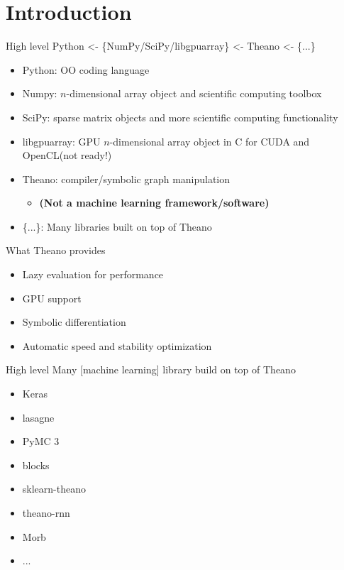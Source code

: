 \documentclass[utf8x,xcolor=pdftex,dvipsnames,table]{beamer}
\begin{document}
\section{Introduction}
\begin{frame}
  \tableofcontents[currentsection]
\end{frame}

\begin{frame}{High level}\setcounter{page}{1}
  Python <- \{NumPy/SciPy/libgpuarray\} <- Theano <- \{...\}
  \begin{itemize}
  \item Python: OO coding language
  \item Numpy: $n$-dimensional array object and scientific computing toolbox
  \item SciPy: sparse matrix objects and more scientific computing functionality
  \item libgpuarray: GPU $n$-dimensional array object in C for CUDA and OpenCL(not ready!)
  \item Theano: compiler/symbolic graph manipulation
    \begin{itemize}
    \item \bf{(Not a machine learning framework/software)}
    \end{itemize}
  \item \{...\}: Many libraries built on top of Theano
  \end{itemize}
\end{frame}

\begin{frame}{What Theano provides}
  \begin{itemize}
    \item Lazy evaluation for performance
    \item GPU support
    \item Symbolic differentiation
    \item Automatic speed and stability optimization
  \end{itemize}

\end{frame}

\begin{frame}{High level}
  Many [machine learning] library build on top of Theano
  \begin{itemize}
  \item Keras
  \item lasagne
  \item PyMC 3
  \item blocks
  \item sklearn-theano
  \item theano-rnn
  \item Morb
  \item ...
  \end{itemize}
\end{frame}
\end{document}
